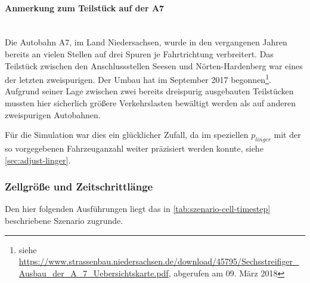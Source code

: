 \paragraph*{Anmerkung zum Teilstück auf der A7}
\hfill \\
Die Autobahn A7, im Land Niedersachsen, wurde in den vergangenen Jahren bereits an vielen Stellen auf drei Spuren je Fahrtrichtung verbreitert.
Das Teilstück zwischen den Anschlussstellen Seesen und Nörten-Hardenberg war eines der letzten zweispurigen.
Der Umbau hat im September 2017 begonnen\footnote{siehe \url{https://www.strassenbau.niedersachsen.de/download/45795/Sechsstreifiger_Ausbau_der_A_7_Uebersichtskarte.pdf}, abgerufen am 09. März 2018}.
Aufgrund seiner Lage zwischen zwei bereits dreispurig ausgebauten Teilstücken mussten hier sicherlich größere Verkehrslasten bewältigt werden als auf anderen zweispurigen Autobahnen.

Für die Simulation war dies ein glücklicher Zufall, da im speziellen $p_{linger}$ mit der so vorgegebenen Fahrzeuganzahl weiter präzisiert werden konnte, siehe \cref{sec:adjust-linger}.



\subsubsection{Zellgröße und Zeitschrittlänge}
\label{sec:cellsize-timesteplength}

Den hier folgenden Ausführungen liegt das in \cref{tab:szenario-cell-timestep} beschriebene Szenario zugrunde.

